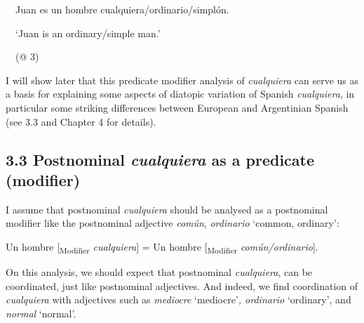 \begin{styleStandard}
\ \ Juan es un hombre cualquiera/ordinario/simplón.
\end{styleStandard}

\begin{styleStandard}
\ \ ‘Juan is an ordinary/simple man.’
\end{styleStandard}

\begin{styleStandard}
\ \ (@ 3)
\end{styleStandard}

\begin{styleStandard}
I will show later that this predicate modifier analysis of \textit{cualquiera} can serve us as a basis for explaining some aspects of diatopic variation of Spanish \textit{cualquiera}, in particular some striking differences between European and Argentinian Spanish (see 3.3 and Chapter 4 for details). 
\end{styleStandard}

\subsection[3.3 Postnominal cualquiera as a predicate (modifier)]{\textbf{3.3 Postnominal }\textbf{\textit{cualquiera}}\textbf{ as a predicate (modifier}\textbf{)}}
\begin{styleStandard}
I assume that postnominal \textit{cualquiera} should be analysed as a postnominal modifier like the postnominal adjective \textit{común}, \textit{ordinario }‘common, ordinary’:
\end{styleStandard}


\setcounter{listWWNumxleveli}{0}
\begin{listWWNumxleveli}
\item 
\begin{styleStandard}
Un hombre [\textsubscript{Modifier} \textit{cualquiera}] = Un hombre [\textsubscript{Modifier} \textit{común/ordinario}]. 
\end{styleStandard}
\end{listWWNumxleveli}
\begin{styleStandard}
On this analysis, we should expect that postnominal \textit{cualquiera}, can be coordinated, just like postnominal adjectives. And indeed, we find coordination of \textit{cualquiera} with adjectives such as \textit{mediocre }‘mediocre’\textit{, ordinario} ‘ordinary’, and \textit{normal} ‘normal’.
\end{styleStandard}

